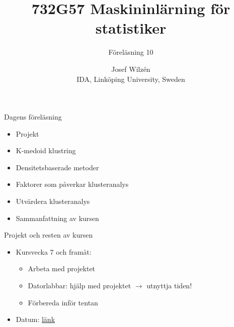 \documentclass[10pt,english]{beamer}
\title{732G57 Maskininlärning för statistiker}
\subtitle{Föreläsning 10}
\date{}
\author{Josef Wilzén \\ IDA, Linköping University, Sweden}
\begin{document}
\maketitle

\begin{frame}{Dagens föreläsning}

    \begin{itemize}
        \item Projekt
        \item K-medoid klustring
        \item Densitetsbaserade metoder
        \item Faktorer som påverkar klusteranalys
        \item Utvärdera klusteranalys
        \item Sammanfattning av kursen
    \end{itemize}
    
\end{frame}

\begin{frame}{Projekt och resten av kursen}
    
  \begin{itemize}
        \item Kursvecka 7 och framåt: 
        \begin{itemize}
          \item Arbeta med projektet
          \item Datorlabbar: hjälp med projektet $\rightarrow$ utnyttja tiden!
          \item Förbereda inför tentan
        \end{itemize}
        \item Datum: \href{https://raw.githubusercontent.com/STIMALiU/732G12_DM/refs/heads/master/project/Datum_ht2024.pdf}{länk}
    \end{itemize}

\end{frame}
\end{document}
